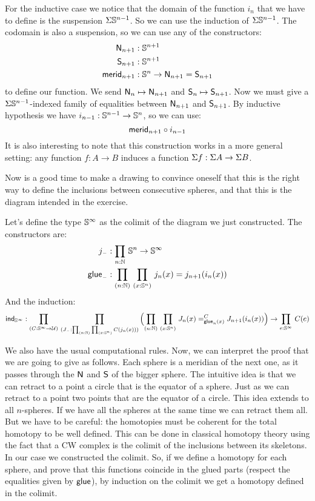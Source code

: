 \documentclass[
%
%
11pt %
]{article}
\begin{document}
For the inductive case we notice that the domain of the function $i_n$ that
we have to define is the suspension $\Sigma \mathbb{S}^{n-1}$. So we can use the
induction of $\Sigma \mathbb{S}^{n-1}$. The codomain is also a suspension, so we can
use any of the constructors:
\begin{align*}
  \mathsf{N}_{n+1} &: \mathbb{S}^{n+1}\\
  \mathsf{S}_{n+1} &: \mathbb{S}^{n+1}\\
  \mathsf{merid}_{n+1} &:\mathbb{S}^n \to \mathsf{N}_{n+1} = \mathsf{S}_{n+1}
\end{align*}
to define our function.
We send $\mathsf{N}_n \mapsto \mathsf{N}_{n+1}$ and $\mathsf{S}_n \mapsto \mathsf{S}_{n+1}$.
Now we must give a $\Sigma \mathbb{S}^{n-1}$-indexed family of equalities between
$\mathsf{N}_{n+1}$ and $\mathsf{S}_{n+1}$. By inductive hypothesis we have
$i_{n-1} : \mathbb{S}^{n-1} \to \mathbb{S}^n$, so we can use:
\[ \mathsf{merid}_{n+1} \circ i_{n-1} \]
It is also interesting to note that this construction works in a more general
setting: any function $f : A \to B$ induces a function $\Sigma f : \Sigma A \to \Sigma B$.

Now is a good time to make a drawing to convince oneself that this is the
right way to define the inclusions between consecutive spheres, and that this
is the diagram intended in the exercise.

Let's define the type $\mathbb{S}^{\infty}$ as the colimit of the diagram we just
constructed. The constructors are:
\begin{align*}
  j_{\blank} &: \prd{n : \nat} \Sn^n \to \Sn^{\infty}\\
  \glue_{\blank} &: \prd{n : \nat}{x: \Sn^n} j_n(x) = j_{n+1}(i_n (x))
\end{align*}
And the induction:
\[
  \ind{\Sn^{\infty}} : \prd{C:\Sn^\infty \to \UU}{J_{\blank} : \prd{n : \nat}{x : \Sn^n} C(j_n(x))}
  \Parens{\prd{n:\nat}{x:\Sn^n} \dpath C {\glue_n(x)} {J_n(x)} {J_{n+1} (i_n (x))}}
  \to \prd{e:\Sn^{\infty}} C(e)
\]

We also have the usual computational rules.
Now, we can interpret the proof that we are going to give as follows.
Each sphere is a meridian of the next one, as it passes
through the $\mathsf{N}$ and $\mathsf{S}$ of the bigger sphere.
The intuitive idea is that we can retract to a point a circle that is the equator of a sphere.
Just as we can retract to a point two points that are the equator of a circle.
This idea extends to all $n$-spheres. If we have all the spheres at the same time
we can retract them all. But we have to be careful: the homotopies
must be coherent for the total homotopy to be well defined. This can be done in
classical homotopy theory using the fact that a CW complex is the colimit of
the inclusions between its skeletons. In our case we constructed the colimit.
So, if we define a homotopy for each sphere, and prove that this functions
coincide in the glued parts (respect the equalities given by $\mathsf{glue}$), by
induction on the colimit we get a homotopy defined in the colimit.
\end{document}
